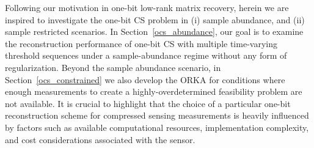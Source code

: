 \documentclass[12pt,draftcls,onecolumn]{IEEEtran}
\begin{document}

Following our motivation in one-bit low-rank matrix recovery, herein we are inspired to investigate the one-bit CS problem in (i) sample abundance, and (ii) sample restricted scenarios. In Section~\ref{ocs_abundance}, our goal is to 
examine the reconstruction performance of one-bit CS with multiple time-varying threshold sequences under a sample-abundance regime without any form of regularization. Beyond the sample abundance scenario, in Section~\ref{ocs_constrained} we also develop the ORKA for conditions where enough measurements to create a highly-overdetermined feasibility problem are not available. It is crucial to highlight that the choice of a particular one-bit 
reconstruction scheme for compressed sensing measurements is heavily influenced by factors such as available computational resources, implementation complexity, and cost considerations associated with the sensor. %
\end{document}
